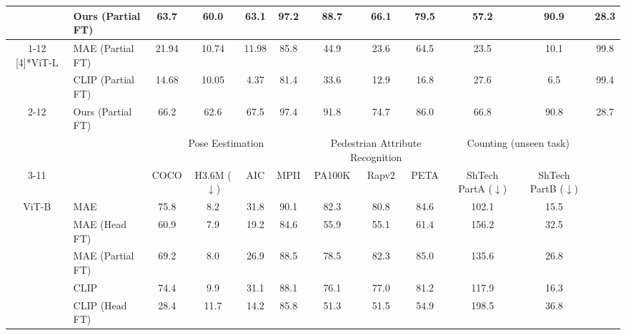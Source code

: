 \documentclass[10pt,twocolumn,letterpaper]{article}
\begin{document}
\begin{table*}[t]
\begin{tabular}{cl|cccccccccc}
          & Ours (Partial FT) & 63.7  & 60.0  & 63.1  & \cellcolor[rgb]{ .949,  .949,  .949} 97.2  & 88.7  & 66.1  & 79.5  & \cellcolor[rgb]{ .949,  .949,  .949} 57.2  & 90.9  & \cellcolor[rgb]{ .949,  .949,  .949} 28.3  \\
\cmidrule{1-12}    \multirow{3}[4]{*}{ViT-L} & MAE (Partial FT) & 21.94 & 10.74 & 11.98 & \cellcolor[rgb]{ .949,  .949,  .949} 85.8  & 44.9  & 23.6  & 64.5  & \cellcolor[rgb]{ .949,  .949,  .949} 23.5  & 10.1  & \cellcolor[rgb]{ .949,  .949,  .949} 99.8  \\
          & CLIP (Partial FT) & 14.68 & 10.05 & 4.37  & \cellcolor[rgb]{ .949,  .949,  .949} 81.4  & 33.6  & 12.9  & 16.8  & \cellcolor[rgb]{ .949,  .949,  .949} 27.6  & 6.5   & \cellcolor[rgb]{ .949,  .949,  .949} 99.4  \\
\cmidrule{2-12}          & Ours (Partial FT) & 66.2  & 62.6  & 67.5  & \cellcolor[rgb]{ .949,  .949,  .949} 97.4  & 91.8  & 74.7  & 86.0  & \cellcolor[rgb]{ .949,  .949,  .949} 66.8  & 90.8  & \cellcolor[rgb]{ .949,  .949,  .949} 28.7  \\
    \midrule
          &       & \multicolumn{4}{c}{Pose Eestimation} & \multicolumn{3}{c}{Pedestrian Attribute Recognition} & \multicolumn{2}{c}{Counting (unseen task)} &  \\
\cmidrule{3-11}          &       & COCO  & H3.6M ($\downarrow$) & AIC   & \cellcolor[rgb]{ .949,  .949,  .949} MPII & PA100K & Rapv2 & \cellcolor[rgb]{ .949,  .949,  .949} PETA & ShTech PartA ($\downarrow$) & ShTech PartB ($\downarrow$) &  \\
    \multirow{9}[4]{*}{ViT-B} & MAE   & 75.8  & 8.2   & 31.8  & \cellcolor[rgb]{ .949,  .949,  .949} 90.1  & 82.3  & 80.8  & \cellcolor[rgb]{ .949,  .949,  .949} 84.6  & 102.1  & 15.5  &  \\
          & MAE (Head FT) & 60.9  & 7.9   & 19.2  & \cellcolor[rgb]{ .949,  .949,  .949} 84.6  & 55.9  & 55.1  & \cellcolor[rgb]{ .949,  .949,  .949} 61.4  & 156.2  & 32.5  &  \\
          & MAE (Partial FT) & 69.2  & 8.0   & 26.9  & \cellcolor[rgb]{ .949,  .949,  .949} 88.5  & 78.5  & 82.3  & \cellcolor[rgb]{ .949,  .949,  .949} 85.0  & 135.6  & 26.8  &  \\
\cmidrule{2-12}          & CLIP  & 74.4  & 9.9   & 31.1  & \cellcolor[rgb]{ .949,  .949,  .949} 88.1  & 76.1  & 77.0  & \cellcolor[rgb]{ .949,  .949,  .949} 81.2  & 117.9  & 16.3  &  \\
          & CLIP (Head FT) & 28.4  & 11.7  & 14.2  & \cellcolor[rgb]{ .949,  .949,  .949} 85.8  & 51.3  & 51.5  & \cellcolor[rgb]{ .949,  .949,  .949} 54.9  & 198.5  & 36.8  &  \\

\end{tabular}
\end{table*}
\end{document}
